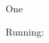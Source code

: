 \documentclass{elsarticle}
\begin{document}
\begin{nomenclature}
\item One
\end{nomenclature}

Running: \shorttitle
\end{document}
